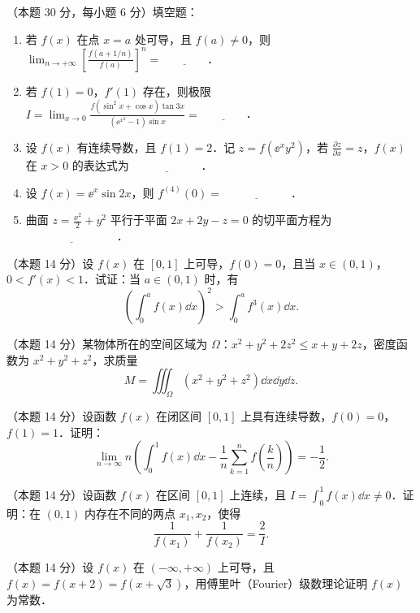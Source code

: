 
\begin{problems}
\item[一、]（本题 30 分，每小题 6 分）填空题：
\begin{enumerate}
  \item 若 $f(x)$ 在点 $x=a$ 处可导，且 $f(a)\neq 0$，则 $\displaystyle \lim_{n\to+\infty}\left[\frac{f(a+1/n)}{f(a)}\right]^{n}=\underline{\hspace{4em}}$．
  \item 若 $f(1)=0$，$f'(1)$ 存在，则极限 $\displaystyle I=\lim_{x\to 0}\frac{f(\sin^2x+\cos x)\tan 3x}{\left(\ee^{x^2}-1\right)\sin x}=\underline{\hspace{4em}}$．
  \item 设 $f(x)$ 有连续导数，且 $f(1)=2$．记 $z=f(\ee^xy^2)$，若 $\displaystyle \frac{\partial z}{\partial x}=z$，$f(x)$ 在 $x>0$ 的表达式为 $\underline{\hspace{6em}}$．
  \item 设 $f(x)=\ee^x\sin 2x$，则 $f^{(4)}(0)=\underline{\hspace{6em}}$．
  \item 曲面 $z=\frac{x^2}{2}+y^2$ 平行于平面 $2x+2y-z=0$ 的切平面方程为 $\underline{\hspace{8em}}$．
\end{enumerate}

\item[二、]（本题 14 分）设 $f(x)$ 在 $[0,1]$ 上可导，$f(0)=0$，且当 $x\in(0,1)$，$0<f'(x)<1$．试证：当 $a\in(0,1)$ 时，有
\[
  \left(\int_0^a f(x)\dd x\right)^2>\int_0^a f^3(x)\dd x.
\]

\item[三、]（本题 14 分）某物体所在的空间区域为 $\Omega$：$x^2+y^2+2z^2\le x+y+2z$，密度函数为 $x^2+y^2+z^2$，求质量
\[
  M=\iiint_\Omega \left(x^2+y^2+z^2\right)\dd x\dd y\dd z.
\]

\item[四、]（本题 14 分）设函数 $f(x)$ 在闭区间 $[0,1]$ 上具有连续导数，$f(0)=0$，$f(1)=1$．证明：
\[
  \lim_{n\to\infty}n\left(\int_0^1 f(x)\dd x-\frac{1}{n}\sum_{k=1}^n f\left(\frac{k}{n}\right)\right)=-\frac{1}{2}.
\]

\item[五、]（本题 14 分）设函数 $f(x)$ 在区间 $[0,1]$ 上连续，且 $\displaystyle I=\int_0^1 f(x)\dd x\neq 0$．证明：在 $(0,1)$ 内存在不同的两点 $x_1,x_2$，使得
\[
  \frac{1}{f(x_1)}+\frac{1}{f(x_2)}=\frac{2}{I}.
\]

\item[六、]（本题 14 分）设 $f(x)$ 在 $(-\infty,+\infty)$ 上可导，且 $f(x)=f(x+2)=f(x+\sqrt{3})$，用傅里叶（Fourier）级数理论证明 $f(x)$ 为常数．
\end{problems}

